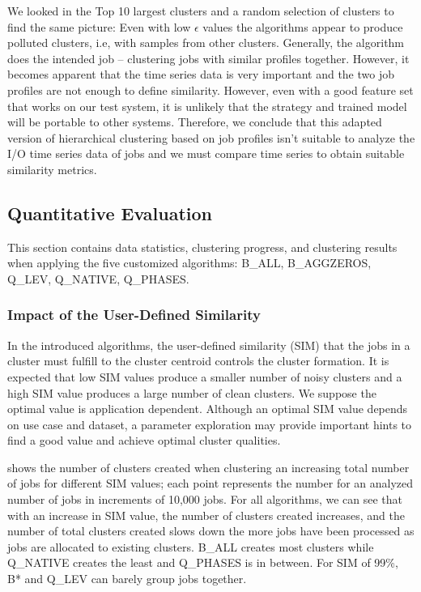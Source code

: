 \documentclass{jhps}
\begin{document}
We looked in the Top 10 largest clusters and a random selection of clusters to find the same picture:
Even with low $\epsilon$ values the algorithms appear to produce polluted clusters, i.e, with samples from other clusters.
Generally, the algorithm does the intended job -- clustering jobs with similar profiles together.
However, it becomes apparent that the time series data is very important and the two job profiles are not enough to define similarity.
However, even with a good feature set that works on our test system, it is unlikely that the strategy and trained model will be portable to other systems.
Therefore, we conclude that this adapted version of hierarchical clustering based on job profiles isn't suitable to analyze the I/O time series data of jobs and we must compare time series to obtain suitable similarity metrics.

\subsection{Quantitative Evaluation}
This section contains data statistics, clustering progress, and clustering results when applying the five customized algorithms: B\_ALL,  B\_AGGZEROS, Q\_LEV, Q\_NATIVE, Q\_PHASES.

\subsubsection{Impact of the User-Defined Similarity}
In the introduced algorithms, the user-defined similarity (SIM) that the jobs in a cluster must fulfill to the cluster centroid controls the cluster formation.
It is expected that low SIM values produce a smaller number of noisy clusters and a high SIM value produces a large number of clean clusters.
We suppose the optimal value is application dependent.
Although an optimal SIM value depends on use case and dataset, a parameter exploration may provide important hints to find a good value and achieve optimal cluster qualities.

 shows the number of clusters created when clustering an increasing total number of jobs for different SIM values; each point represents the number for an analyzed number of jobs in increments of 10,000 jobs.
For all algorithms, we can see that with an increase in SIM value, the number of clusters created increases, and the number of total clusters created slows down the more jobs have been processed as jobs are allocated to existing clusters.
B\_ALL creates most clusters while Q\_NATIVE creates the least and Q\_PHASES is in between.
For SIM of 99\%, B* and Q\_LEV can barely group jobs together.
\end{document}
